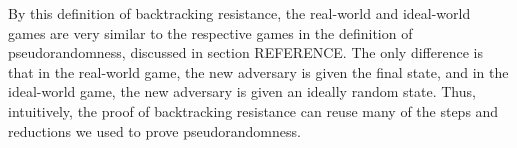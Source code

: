 \documentclass[12pt,lot, lof]{puthesis}
\newenvironment{game}
{ \begin{itemize}[noitemsep,nolistsep] 
}
{ \end{itemize}                  }
\newcommand{\s} {\textrm{ }}
\newcommand{\lar}{\leftarrow}
\begin{document}
By this definition of backtracking resistance, the real-world and ideal-world games are very similar to the respective games in the definition of pseudorandomness, discussed in section REFERENCE. The only difference is that in the real-world game, the new adversary is given the final state, and in the ideal-world game, the new adversary is given an ideally random state. Thus, intuitively, the proof of backtracking resistance can reuse many of the steps and reductions we used to prove pseudorandomness.


\end{document}
